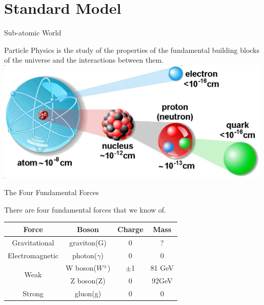 \section[Standard Model]{Standard Model}

\begin{frame}{Sub-atomic World}
\begin{center}
Particle Physics is the study of the properties of the fundamental building blocks of the universe and the interactions between them.
\\
\vspace{1em}
\includegraphics[width=0.99\textwidth]{images/subatomic_world.jpg}
\end{center}
\end{frame}





\begin{frame}{The Four Fundamental Forces}
\begin{center}
There are four fundamental forces that we know of.
\\
\vspace{1em}
\begin{tabular}{ c c c c }
Force  & Boson    & Charge & Mass \\ \hline
Gravitational & graviton(G) & 0 & ? \\
Electromagnetic & photon($\gamma$) & 0 & 0 \\

\multirow{2}{*}{Weak} & W boson($W^{\pm}$) & $\pm$1 & 81 GeV \\
                      & Z boson(Z) & 0 & 92GeV \\

Strong & gluon(g) & 0      & 0 \\
\end{tabular}
\end{center}
\end{frame}




